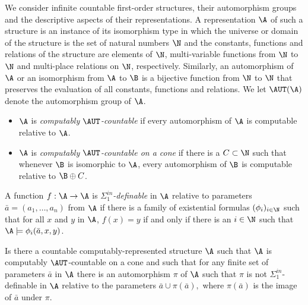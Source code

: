 We consider infinite countable first-order structures, their automorphism groups and the descriptive aspects of their representations. A representation $\A$ of such a structure is an instance of its isomorphism type in which the universe or domain of the structure is the set of natural numbers $\N$ and the constants, functions and relations of the structure are elements of $\N$, multi-variable functions from $\N$ to $\N$ and multi-place relations on $\N$, respectively.   Similarly, an automorphism of $\A$ or an isomorphism from $\A$ to $\B$ is a bijective function from $\N$ to $\N$ that preserves the evaluation of all constants, functions and relations.  We let $\AUT(\A)$ denote the automorphism group of $\A$.

\begin{definition}\label{1.1}
  \begin{itemize}
  \item     $\A$ is \emph{computably $\AUT$-countable} if every automorphism of $\A$ is computable relative to $\A$.  
  \item  $\A$ is \emph{computably $\AUT$-countable on a cone} if there is a $C\subset\N$ such that whenever $\B$ is isomorphic to $\A$, every automorphism of $\B$ is computable relative to $\B\oplus C$.
  \end{itemize}
\end{definition}


\begin{definition}
  A function $f:\A\to\A$ is \emph{$\Sigma^{in}_1$-definable} in $\A$ relative to parameters
  $\bar{a}=(a_1,\dots,a_n)$ from $\A$ if there is a family of existential formulas $(\phi_i)_{i\in\N}$ such that for all $x$ and $y$ in $\A$, $f(x)=y$ if and only if there is an $i\in\N$ such that $\A\models\phi_i(\bar{a},x,y)$.
\end{definition}

\begin{question}\label{sec:question}\label{1.2}
  Is there a countable computably-represented structure $\A$ such that $\A$ is computably $\AUT$-countable on a cone and such that for any finite  set of parameters $\bar{a}$ in $\A$ there is an automorphism $\pi$ of $\A$ such that $\pi$ is not $\Sigma^{in}_1$-definable in $\A$ relative to the parameters $\bar{a}\cup \pi(\bar{a}),$ where $\pi(\bar{a})$ is the image of $\bar{a}$ under $\pi$.
\end{question}